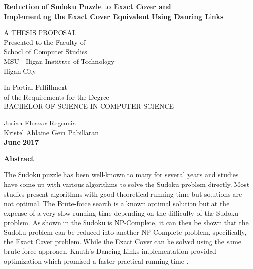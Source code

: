 \documentclass[a4paper,oneside,11pt]{report}
\begin{document}
\thispagestyle{empty}
\singlespacing
\begin{center}

{\bf\Large Reduction of Sudoku Puzzle to Exact Cover and}\\
{\bf\Large Implementing the Exact Cover Equivalent Using Dancing Links}

\vspace{\fill}

{A THESIS PROPOSAL}\\[.25in]

{Presented to the Faculty of\\
School of Computer Studies\\
MSU - Iligan Institute of Technology\\
Iligan City}

\vspace{\fill}

{In Partial Fulfillment\\
of the Requirements for the Degree\\
BACHELOR OF SCIENCE IN COMPUTER SCIENCE}\\

\vspace{\fill}

{Josiah Eleazar Regencia\\
Kristel Ahlaine Gem Pabillaran}\\
{\bf June 2017}

\end{center}

\newpage
\doublespacing
{}
\begin{center}
 \textbf{\Large Abstract}
\end{center}
\vspace{0.8cm}

The Sudoku puzzle has been well-known to many for several years and studies have come up with various algorithms to solve the Sudoku problem directly. Most studies present algorithms with good theoretical running time but solutions are not optimal. The Brute-force search is a known optimal solution but at the expense of a very slow running time depending on the difficulty of the Sudoku problem. As shown in \cite{Yato} the Sudoku is NP-Complete, it can then be shown that the Sudoku problem can be reduced into another NP-Complete problem, specifically, the Exact Cover problem. While the Exact Cover can be solved using the same brute-force approach, Knuth's Dancing Links implementation provided optimization which promised a faster practical running time \cite{Knuth}.
\end{document}
